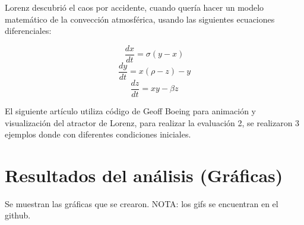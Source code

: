 \documentclass[12pt]{article}
\begin{document}
Lorenz descubrió el caos por accidente, cuando quería hacer un modelo matemático de la convección atmosférica, usando las siguientes ecuaciones diferenciales:

\begin{equation}
\frac{dx}{dt}=\sigma (y-x)
\end{equation}
\begin{equation}
\frac{dy}{dt}= x(\rho -z)-y
\end{equation}
\begin{equation}
\frac{dz}{dt}=xy -\beta z
\end{equation}

El siguiente artículo utiliza código de Geoff Boeing para animación y visualización del atractor de Lorenz, para realizar la evaluación 2, se realizaron 3 ejemplos donde con diferentes condiciones iniciales. 

\section{Resultados del análisis (Gráficas)}

Se muestran las gráficas que se crearon. NOTA: los gifs se encuentran en el github.

\clearpage
\end{document}

